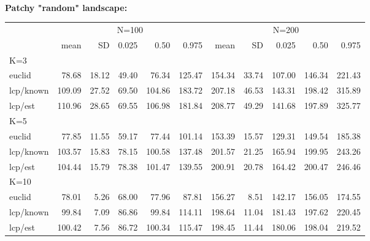 \documentclass[12pt]{article}
\begin{document}
\begin{table}[h!]
{\begin{tabular}{l|rrrrr|rrrrr}
\end{tabular}
\\
{\bf Patchy "random" landscape: } \\
\begin{tabular}{l|rrrrrrrrrr}
         & \multicolumn{5}{c}{N=100  } & \multicolumn{5}{c}{N=200   }  \\
         &   mean &  SD  & 0.025 & 0.50  & 0.975  & mean  & SD   & 0.025 & 0.50  & 0.975 \\ \hline
K=3      &        &      &       &       &        &       &      &       &       &       \\
euclid   &  78.68 & 18.12& 49.40 & 76.34 & 125.47 & 154.34& 33.74& 107.00& 146.34& 221.43\\
lcp/known& 109.09 & 27.52& 69.50 &104.86 & 183.72 & 207.18& 46.53& 143.31& 198.42& 315.89\\
lcp/est  & 110.96 & 28.65& 69.55 &106.98 & 181.84 & 208.77& 49.29& 141.68& 197.89& 325.77\\
K=5      &        &      &       &       &        &       &      &       &       &        \\
euclid   &  77.85 & 11.55& 59.17 & 77.44 & 101.14 & 153.39& 15.57& 129.31& 149.54& 185.38\\
lcp/known& 103.57 & 15.83& 78.15 &100.58 & 137.48 & 201.57& 21.25& 165.94& 199.95& 243.26\\
lcp/est  & 104.44 & 15.79& 78.38 &101.47 & 139.55 & 200.91& 20.78& 164.42& 200.47& 246.46\\
K=10     &        &      &       &       &        &       &      &       &       &       \\
euclid   &  78.01 & 5.26 & 68.00 & 77.96 & 87.81  & 156.27&  8.51& 142.17& 156.05& 174.55\\
lcp/known&  99.84 & 7.09 & 86.86 & 99.84 & 114.11 & 198.64& 11.04& 181.43& 197.62& 220.45\\
lcp/est  & 100.42 & 7.56 & 86.72 &100.34 & 115.47 & 198.45& 11.44& 180.06& 198.04& 219.52\\ \hline
\end{tabular}
}
\label{tab.results1}
\end{table}
\end{document}
